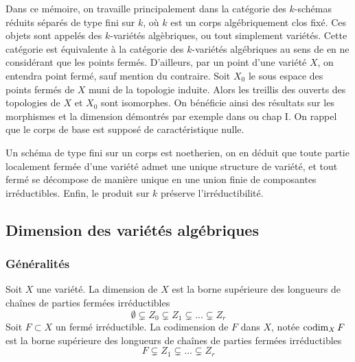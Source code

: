 Dans ce mémoire, on travaille principalement dans la catégorie des $k$-schémas réduits séparés de type fini sur $k$, où $k$ est un corps algébriquement clos fixé. Ces objets sont appelés des $k$-variétés algèbriques, ou tout simplement variétés.  Cette catégorie est équivalente à la catégorie des $k$-variétés algébriques au sens de \cite{LAGSpringer} en ne considérant que les points fermés. D'ailleurs, par un point d'une variété $X$, on entendra point fermé, sauf mention du contraire. Soit $X_0$ le sous espace des points fermés de $X$ muni de la topologie induite. Alors les treillis des ouverts des topologies de $X$ et $X_0$ sont isomorphes. On bénéficie ainsi des résultats sur les morphismes et la dimension démontrés par exemple dans \cite{LAGSpringer} ou \cite{MumfordRedBook} chap I. On rappel que le corps de base est supposé de caractéristique nulle.

Un schéma de type fini sur un corps est noetherien, on en déduit que toute partie localement fermée d'une variété admet une unique structure de variété, et tout fermé se décompose de manière unique en une union finie de composantes irréductibles. Enfin, le produit sur $k$ préserve l'irréductibilité.

\subsection{Dimension des variétés algébriques}

\subsubsection{Généralités}

\begin{defn}
Soit $X$ une variété. La dimension de $X$ est la borne supérieure des longueurs de chaînes de parties fermées irréductibles
$$\emptyset \varsubsetneq Z_0 \varsubsetneq Z_1 \varsubsetneq ... \varsubsetneq Z_r$$
Soit $F\subset X$ un fermé irréductible. La codimension de $F$ dans $X$, notée $\operatorname{codim}_X F$ est la borne supérieure des longueurs de chaînes de parties fermées irréductibles
$$F \varsubsetneq Z_1 \varsubsetneq ... \varsubsetneq Z_r$$
\end{defn}

